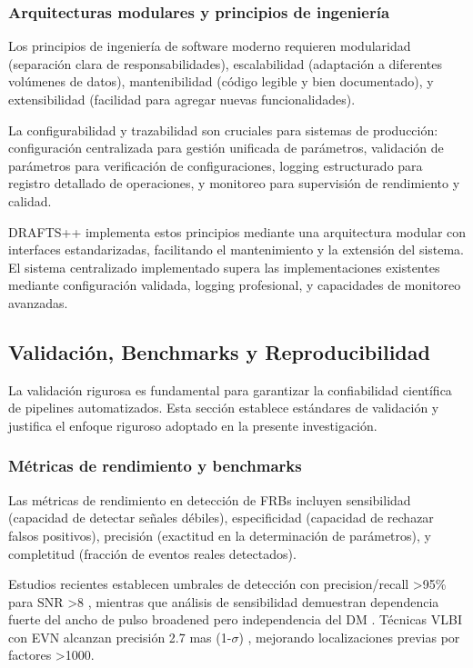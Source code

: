 \subsubsection{Arquitecturas modulares y principios de ingeniería}

Los principios de ingeniería de software moderno requieren modularidad (separación clara de responsabilidades), escalabilidad (adaptación a diferentes volúmenes de datos), mantenibilidad (código legible y bien documentado), y extensibilidad (facilidad para agregar nuevas funcionalidades).

La configurabilidad y trazabilidad son cruciales para sistemas de producción: configuración centralizada para gestión unificada de parámetros, validación de parámetros para verificación de configuraciones, logging estructurado para registro detallado de operaciones, y monitoreo para supervisión de rendimiento y calidad.

DRAFTS++ implementa estos principios mediante una arquitectura modular con interfaces estandarizadas, facilitando el mantenimiento y la extensión del sistema. El sistema centralizado implementado supera las implementaciones existentes mediante configuración validada, logging profesional, y capacidades de monitoreo avanzadas.

\subsection{Validación, Benchmarks y Reproducibilidad}

La validación rigurosa es fundamental para garantizar la confiabilidad científica de pipelines automatizados. Esta sección establece estándares de validación y justifica el enfoque riguroso adoptado en la presente investigación.

\subsubsection{Métricas de rendimiento y benchmarks}

Las métricas de rendimiento en detección de FRBs incluyen sensibilidad (capacidad de detectar señales débiles), especificidad (capacidad de rechazar falsos positivos), precisión (exactitud en la determinación de parámetros), y completitud (fracción de eventos reales detectados).

Estudios recientes establecen umbrales de detección con precision/recall >95\% para SNR >8 \cite{metrics2025}, mientras que análisis de sensibilidad demuestran dependencia fuerte del ancho de pulso broadened pero independencia del DM \cite{sensitivity2025}. Técnicas VLBI con EVN alcanzan precisión 2.7 mas (1-$\sigma$) \cite{vlbi2025}, mejorando localizaciones previas por factores >1000.

